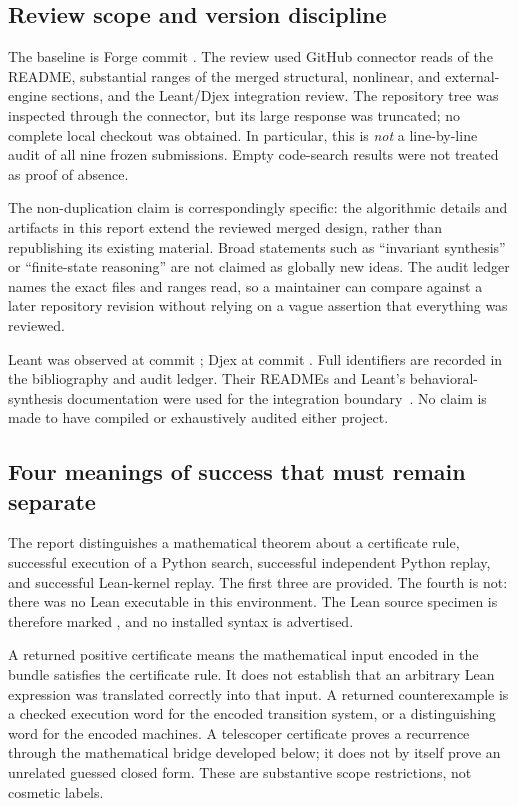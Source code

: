 \subsection{Review scope and version discipline}

The baseline is Forge commit . The review used GitHub connector reads of the README, substantial ranges of the merged structural, nonlinear, and external-engine sections, and the Leant/Djex integration review. The repository tree was inspected through the connector, but its large response was truncated; no complete local checkout was obtained. In particular, this is \emph{not} a line-by-line audit of all nine frozen submissions. Empty code-search results were not treated as proof of absence.

The non-duplication claim is correspondingly specific: the algorithmic details and artifacts in this report extend the reviewed merged design, rather than republishing its existing material. Broad statements such as ``invariant synthesis'' or ``finite-state reasoning'' are not claimed as globally new ideas. The audit ledger names the exact files and ranges read, so a maintainer can compare against a later repository revision without relying on a vague assertion that everything was reviewed.

Leant was observed at commit ; Djex at commit . Full identifiers are recorded in the bibliography and audit ledger. Their READMEs and Leant's behavioral-synthesis documentation were used for the integration boundary~\cite{leant-readme,djex-readme,leant-behavior}. No claim is made to have compiled or exhaustively audited either project.

\subsection{Four meanings of success that must remain separate}

The report distinguishes a mathematical theorem about a certificate rule, successful execution of a Python search, successful independent Python replay, and successful Lean-kernel replay. The first three are provided. The fourth is not: there was no Lean executable in this environment. The Lean source specimen is therefore marked , and no installed \forge{} syntax is advertised.

A returned positive certificate means the mathematical input encoded in the bundle satisfies the certificate rule. It does not establish that an arbitrary Lean expression was translated correctly into that input. A returned counterexample is a checked execution word for the encoded transition system, or a distinguishing word for the encoded machines. A telescoper certificate proves a recurrence through the mathematical bridge developed below; it does not by itself prove an unrelated guessed closed form. These are substantive scope restrictions, not cosmetic labels.

